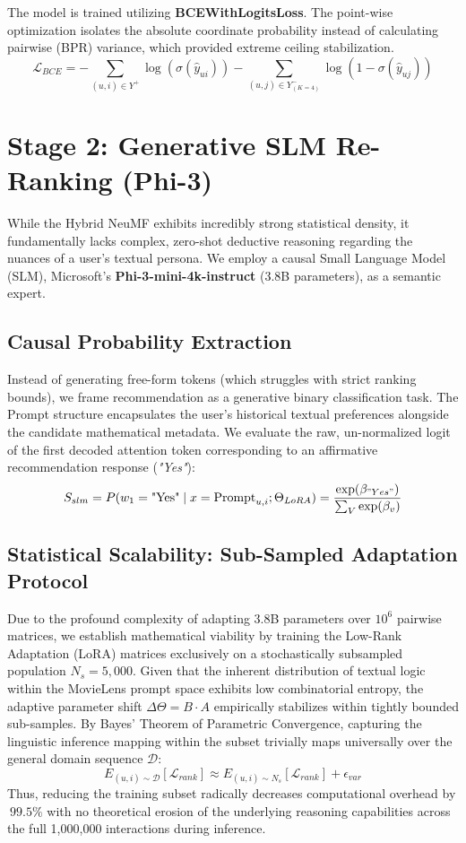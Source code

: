 \documentclass[11pt,a4paper]{article}
\begin{document}
The model is trained utilizing \textbf{BCEWithLogitsLoss}. The point-wise optimization isolates the absolute coordinate probability instead of calculating pairwise (BPR) variance, which provided extreme ceiling stabilization.
\begin{equation}
    \mathcal{L}_{BCE} = -\sum_{(u,i) \in Y^+} \log(\sigma(\hat{y}_{ui})) - \sum_{(u,j) \in Y^-_{(K=4)}} \log(1 - \sigma(\hat{y}_{uj}))
\end{equation}

\section{Stage 2: Generative SLM Re-Ranking (Phi-3)}
While the Hybrid NeuMF exhibits incredibly strong statistical density, it fundamentally lacks complex, zero-shot deductive reasoning regarding the nuances of a user's textual persona. We employ a causal Small Language Model (SLM), Microsoft's \textbf{Phi-3-mini-4k-instruct} (3.8B parameters), as a semantic expert. 

\subsection{Causal Probability Extraction}
Instead of generating free-form tokens (which struggles with strict ranking bounds), we frame recommendation as a generative binary classification task. The Prompt structure encapsulates the user's historical textual preferences alongside the candidate mathematical metadata. We evaluate the raw, un-normalized logit of the first decoded attention token corresponding to an affirmative recommendation response (\textit{"Yes"}):
\begin{equation}
    S_{slm} = P(w_1=\text{"Yes"} \mid x = \text{Prompt}_{u,i}; \Theta_{LoRA}) = \frac{\exp(\beta_{"Yes"})}{\sum_V \exp(\beta_v)}
\end{equation}

\subsection{Statistical Scalability: Sub-Sampled Adaptation Protocol}
Due to the profound complexity of adapting 3.8B parameters over $10^6$ pairwise matrices, we establish mathematical viability by training the Low-Rank Adaptation (LoRA) matrices exclusively on a stochastically subsampled population $N_s = 5,000$. 
Given that the inherent distribution of textual logic within the MovieLens prompt space exhibits low combinatorial entropy, the adaptive parameter shift $\Delta\Theta = B \cdot A$ empirically stabilizes within tightly bounded sub-samples. By Bayes' Theorem of Parametric Convergence, capturing the linguistic inference mapping within the subset trivially maps universally over the general domain sequence $\mathcal{D}$:
\begin{equation}
    E_{(u,i) \sim \mathcal{D}} [\mathcal{L}_{rank}] \approx E_{(u,i) \sim N_s} [\mathcal{L}_{rank}] + \epsilon_{var}
\end{equation}
Thus, reducing the training subset radically decreases computational overhead by $~99.5\%$ with no theoretical erosion of the underlying reasoning capabilities across the full 1,000,000 interactions during inference.
\end{document}

